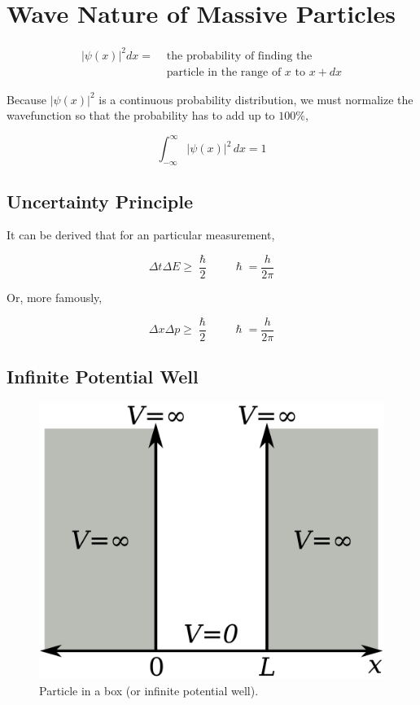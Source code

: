 \documentclass[12pt]{article}
\newcommand{\fundamental}[1]{\colorbox{gray!30}{\strut$#1$}}
\newcommand{\wave}{
    \begin{tikzpicture}[scale=0.1, transform shape]
    \begin{axis}[
      xmin=-15,
      xmax=15,
      ymin=-2,
      ymax=2,
      axis x line=middle,
      axis y line=middle,
      yticklabels={,,},
      xticklabels={,,},
      samples = 2000
    ]
    \addplot[red] {2*exp(-0.05*x^2)*cos(deg(3.5*x))};

    \end{axis}
    \end{tikzpicture}
}
\begin{document}
\section{Wave Nature of Massive Particles}

\begin{align*}
    |\psi (x)|^2 dx = &\text{ the probability of finding the} \\
                      &\text{ particle in the range of $x$ to $x+dx$}
\end{align*}

Because $|\psi(x)|^2$ is a continuous probability distribution, we must normalize the wavefunction so that the probability has to add up to $100\%$,

\begin{equation*}
    \int _{-\infty} ^{\infty} |\psi(x)|^2 \, dx = 1
\end{equation*}

\subsection{Uncertainty Principle}
It can be derived that for an particular measurement,

\begin{equation*}
    \Delta t \Delta E \geq \frac{\hslash}{2} \quad\quad \hslash = \frac{h}{2\pi}
\end{equation*}

Or, more famously,

\begin{equation*}
    \Delta x \Delta p \geq \frac{\hslash}{2} \quad\quad \hslash = \frac{h}{2\pi}
\end{equation*}

\subsection{Infinite Potential Well}

\begin{figure}
    \centering
    \includegraphics[width=.45\textwidth]{particle-in-a-box}

    \caption{Particle in a box (or infinite potential well).}
    \label{fig:potential-well}
\end{figure}
\end{document}
